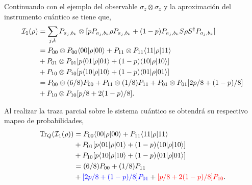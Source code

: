Continuando con el ejemplo del observable $\sigma_z \otimes \sigma_z$ y la aproximación del instrumento cuántico se tiene que,
\begin{equation}\label{primer_alternativa_ejemplo}
    \begin{split}
        \mathcal{I}_1(\rho)&=\sum_{j,k}P_{a_j,b_k}\otimes[p P_{a_j,b_k}\rho P_{a_j,b_k}+(1-p)P_{a_j,b_k}S\rho S^\dagger P_{a_j,b_k}]\\
        &=P_{00}\otimes P_{00} \langle 00|\rho|00\rangle + P_{11}\otimes P_{11} \langle 11|\rho|11\rangle\\
        &+P_{01} \otimes P_{01}[p \langle 01|\rho|01\rangle+(1-p)\langle 10|\rho|10\rangle]\\
        &+P_{10} \otimes P_{10}[p \langle 10|\rho|10\rangle+(1-p)\langle 01|\rho|01\rangle]\\
        &=P_{00}\otimes (6/8)P_{00} + P_{11}\otimes (1/8)P_{11}+P_{01} \otimes P_{01}[2p/8 +(1-p)/8]\\
        &+P_{10} \otimes P_{10}[p/8+2(1-p)/8].\\
    \end{split}
\end{equation}


Al realizar la traza parcial sobre le sistema cuántico se obtendrá su respectivo mapeo de probabilidades, \begin{equation}\label{traza_S1_ejemplo1}
    \begin{split}
        {\rm Tr}_Q(\mathcal{I}_1(\rho)) &= P_{00} \langle 00|\rho|00\rangle + P_{11} \langle 11|\rho|11\rangle\\
        &+P_{01}[p \langle 01|\rho|01\rangle+(1-p)\langle 10|\rho|10\rangle]\\
        &+P_{10}[p \langle 10|\rho|10\rangle+(1-p)\langle 01|\rho|01\rangle]\\
        &=(6/8)P_{00} + (1/8)P_{11}\\
        &+{\color{blue}[2p/8 +(1-p)/8]P_{01}}+ {\color{red}[p/8+2(1-p)/8]P_{10}}.\\
    \end{split}
\end{equation}

